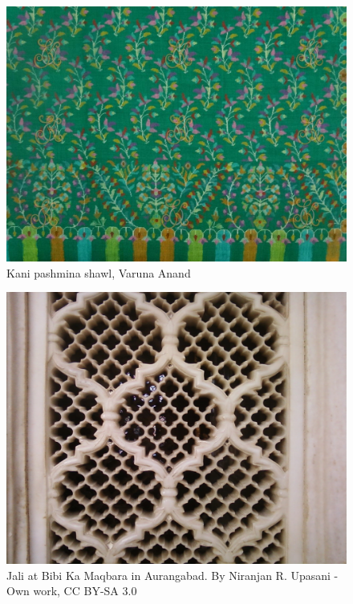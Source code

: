 \documentclass{beamer}
\begin{document}
\begin{frame}
    \begin{figure}
        \includegraphics[height=0.7\textheight]{Splendor-of-kashmir-deep-green-kani-pashmina-shawl-by-Varuna-Anand-2}
        \caption{Kani pashmina shawl, Varuna Anand}
    \end{figure}
\end{frame}

\begin{frame}
    \begin{figure}
        \includegraphics[height=0.7\textheight]{Bibi-Ka-Maqbara-_net}
        \caption{Jali at Bibi Ka Maqbara in Aurangabad. By Niranjan R. Upasani - Own work, CC BY-SA 3.0}
    \end{figure}
\end{frame}
\end{document}
